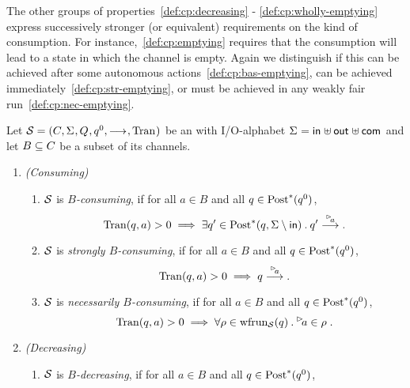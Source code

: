 The other groups of properties~\ref{def:cp:decreasing} - \ref{def:cp:wholly-emptying} express successively stronger (or equivalent) requirements on the kind of consumption. For instance,~\ref{def:cp:emptying} requires that the consumption will lead to a state in which the channel is empty. Again we distinguish if this can be achieved after some autonomous actions~\ref{def:cp:bas-emptying}, can be achieved immediately~\ref{def:cp:str-emptying}, or must be achieved in any weakly fair run~\ref{def:cp:nec-emptying}.



\begin{definition}\label{def:cp}
    Let $\S = \aiotstup{}$ be an \AIOTS with I/O-alphabet $\ioalpha{}$ and let $B \subseteq \chan$ be a subset of its channels.
    \begin{enumerate}[label=P\arabic*:, ref=(P\arabic*), leftmargin=*]
        \item\label{def:cp:consuming} \emph{(Consuming)}
            \begin{enumerate}[label=\alph*), ref=(P\arabic{enumi}.\alph*), leftmargin=*, itemsep=1pt]
                \item\label{def:cp:bas-consuming}$\S$ is \emph{$B$-consuming}, if for all $a \in B$ and all $q \in \post^*(q^0)$,
                \[
                    \val(q,a)>0 \implies \exists q' \in \post^*(q,\Sigma\setminus \inset)\: .\:q' \goes{\inact{a}}.
                \]
                \item\label{def:cp:str-consuming}$\S$ is \emph{strongly $B$-consuming},  if for all $a \in B$ and all $q \in \post^*(q^0)$, 
                \[
                    \val(q,a)>0 \implies q \goes{\inact{a}}.
                \]
                \item\label{def:cp:nec-consuming}$\S$ is \emph{necessarily $B$-consuming}, if for all $a \in B$ and all $q \in \post^*(q^0)$,
                \[
                  \val(q,a)>0 \implies \forall \rho \in \frun{\S}(q) \: .\:\inact{a} \in \rho \;.
                \]
            \end{enumerate}
        \item\label{def:cp:decreasing} \emph{(Decreasing)}
            \begin{enumerate}[label=\alph*), ref=(P\arabic{enumi}.\alph*), leftmargin=*, itemsep=1pt]
                \item\label{def:cp:bas-decreasing}$\S$ is \emph{$B$-decreasing},  if for all $a \in B$ and all $q \in \post^*(q^0)$,

\end{enumerate}
\end{enumerate}
\end{definition}

